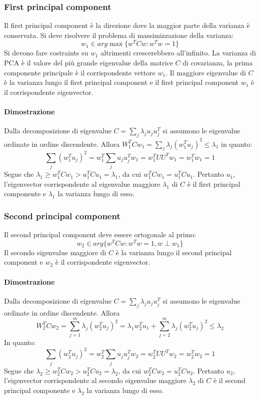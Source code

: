 \subsubsection{First principal component}
Il first principal component \`e la direzione dove la maggior parte della varianza \`e conservata.
Si deve risolvere il problema di massimizzazione della varianza:
$$w_1\in arg\max\{w^TCw:w^Tw=1\}$$
Si devono fare costraints su $w_1$ altrimenti crescerebbero all'infinito.
La varianza di PCA \`e il valore del pi\`u grande eigenvalue della matrice $C$ di covarianza, la prima componente principale \`e il corrispondente vettore $w_1$.
Il maggiore eigenvalue di $C$ \`e la varianza lungo il first principal component e il first principal component $w_1$ \`e il corrispondente eigenvector.

\paragraph{Dimostrazione}
Dalla decomposizione di eigenvalue $C=\sum\limits_j\lambda_ju_ju_j^T$ si assumono le eigenvalue ordinate in ordine discendente.
Allora $W_1^TCw_1 = \sum\limits_j\lambda_j(w_1^Tu_j)^2\le\lambda_1$ in quanto:
$$\sum\limits_j(w_1^Tu_j)^2 = w_1^T\sum\limits_ju_ju_j^Tw_1=w_1^TUU^Tw_1=w_1^Tw_1=1$$
Segue che $\lambda_1\ge w_1^TCw_1 >u_1^TCu_1=\lambda_1$, da cui $w_1^TCw_1=u_1^TCu_1$.
Pertanto $u_1$, l'eigenvector corrispondente al eigenvalue maggiore $\lambda_1$ di $C$ \`e il first principal componente e $\lambda_1$ la varianza lungo di esso.

\subsubsection{Second principal component}
Il second principal component deve essere ortogonale al primo:
$$w_2\in arg\{w^TCw:w^Tw=1,w\perp w_1\}$$
Il secondo eigenvalue maggiore di $C$ \`e la varianza lungo il second principal component e $w_2$ \`e il corrispondente eigenvector.

\paragraph{Dimostrazione}

Dalla decomposizione di eigenvalue $C=\sum\limits_j\lambda_ju_ju_j^T$ si assumono le eigenvalue ordinate in ordine discendente.
Allora
$$W_2^TCw_2 = \sum\limits_{j=1}^m\lambda_j(w_2^Tu_j)^2=\lambda_1w_2^Tu_1+\sum\limits_{j=2}^m\lambda_j(w_2^Tu_j)^2\le\lambda_2$$
In quanto:
$$\sum\limits_j(w_2^Tu_j)^2 = w_2^T\sum\limits_ju_ju_j^Tw_2=w_2^TUU^Tw_2=w_2^Tw_2=1$$
Segue che $\lambda_2\ge w_2^TCw_2 >u_2^TCu_2=\lambda_2$, da cui $w_2^TCw_2=u_2^TCu_2$.
Pertanto $u_2$, l'eigenvector corrispondente al secondo eigenvalue maggiore $\lambda_2$ di $C$ \`e il second principal componente e $\lambda_2$ la varianza lungo di esso.

